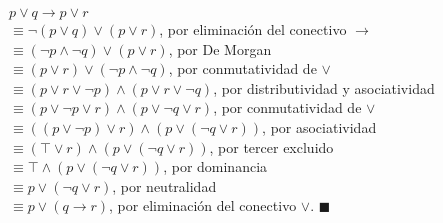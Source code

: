 \documentclass{article}
\begin{document}
$p \lor q \rightarrow p \lor r$\\
$\equiv \lnot (p \lor q) \lor (p \lor r)$, por eliminación del conectivo $\rightarrow$\\
$\equiv (\lnot p \land \lnot q) \lor (p \lor r)$, por De Morgan\\
$\equiv (p \lor r) \lor (\lnot p \land \lnot q)$, por conmutatividad de $\lor$\\
$\equiv (p \lor r \lor \lnot p) \land (p \lor r \lor \lnot q)$, por distributividad y asociatividad\\
$\equiv (p \lor \lnot p \lor r) \land (p \lor \lnot q \lor r)$, por conmutatividad de $\lor$\\
$\equiv ((p \lor \lnot p) \lor r) \land (p \lor (\lnot q \lor r))$, por asociatividad\\
$\equiv (\top \lor r) \land (p \lor (\lnot q \lor r))$, por tercer excluido\\
$\equiv \top \land (p \lor (\lnot q \lor r))$, por dominancia\\
$\equiv p \lor (\lnot q \lor r)$, por neutralidad\\
$\equiv p \lor (q \rightarrow r)$, por eliminación del conectivo $\lor$. $\blacksquare$
\end{document}

